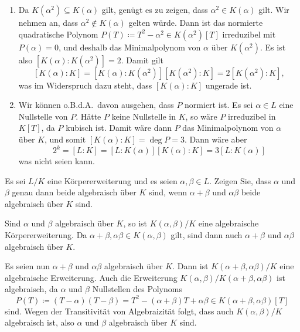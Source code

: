 \begin{solution}
  \begin{enumerate}
    \item
      Da $K(\alpha^2) \subseteq K(\alpha)$ gilt, genügt es zu zeigen, dass $\alpha^2 \in K(\alpha)$ gilt.
      Wir nehmen an, dass $\alpha^2 \notin K(\alpha)$ gelten würde.
      Dann ist das normierte quadratische Polynom $P(T) \coloneqq T^2 - \alpha^2 \in K(\alpha^2)[T]$ irreduzibel mit $P(\alpha) = 0$, und deshalb das Minimalpolynom von $\alpha$ über $K(\alpha^2)$.
      Es ist also $[K(\alpha) : K(\alpha^2)] = 2$.
      Damit gilt
      \[
          [K(\alpha) : K]
        = [K(\alpha) : K(\alpha^2)] [K(\alpha^2) : K]
        = 2 [K(\alpha^2) : K],
      \]
      was im Widerspruch dazu steht, dass $[K(\alpha) : K]$ ungerade ist.
      
    \item
      Wir können o.B.d.A.\ davon ausgehen, dass $P$ normiert ist.
      Es sei $\alpha \in L$ eine Nullstelle von $P$.
      Hätte $P$ keine Nullstelle in $K$, so wäre $P$ irreduzibel in $K[T]$, da $P$ kubisch ist.
      Damit wäre dann $P$ das Minimalpolynom von $\alpha$ über $K$, und somit $[K(\alpha) : K] = \deg P = 3$.
      Dann wäre aber
      \[
              2^k
        =     [L : K]
        =     [L : K(\alpha)] [K(\alpha) : K]
        =     3[L : K(\alpha)]
      \]
      was nicht seien kann.
  \end{enumerate}
\end{solution}


\begin{question}[subtitle = Algebraizität von Summe und Produkt]
  Es sei $L/K$ eine Körpererweiterung und es seien $\alpha, \beta \in L$.
  Zeigen Sie, dass $\alpha$ und $\beta$ genau dann beide algebraisch über $K$ sind, wenn $\alpha + \beta$ und $\alpha \beta$ beide algebraisch über $K$ sind.
\end{question}


\begin{solution}
  Sind $\alpha$ und $\beta$ algebraisch über $K$, so ist $K(\alpha, \beta) / K$ eine algebraische Körpererweiterung.
  Da $\alpha + \beta, \alpha \beta \in K(\alpha, \beta)$ gilt, sind dann auch $\alpha + \beta$ und $\alpha \beta$ algebraisch über $K$.
  
  Es seien nun $\alpha + \beta$ und $\alpha \beta$ algebraisch über $K$.
  Dann ist $K(\alpha + \beta, \alpha \beta)/K$ eine algebraische Erweiterung.
  Auch die Erweiterung $K(\alpha, \beta)/K(\alpha + \beta, \alpha \beta)$ ist algebraisch, da $\alpha$ und $\beta$ Nullstellen des Polynoms
  \[
              P(T)
    \coloneqq (T - \alpha)(T - \beta)
    =         T^2 - (\alpha + \beta)T + \alpha \beta
    \in       K(\alpha + \beta, \alpha \beta)[T]
  \]
  sind.
  Wegen der Transitivität von Algebraizität folgt, dass auch $K(\alpha,\beta)/K$ algebraisch ist, also $\alpha$ und $\beta$ algebraisch über $K$ sind.
\end{solution}


